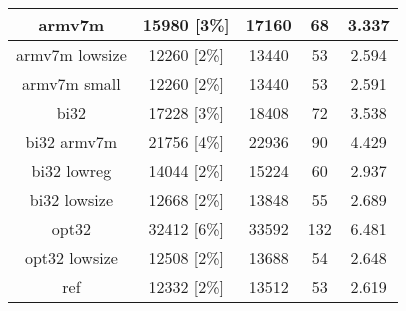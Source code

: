 \begin{table}[h]
\begin{tabular}{|c|c|c|c|c|}
        armv7m & 15980 [3\%] & 17160 & 68 & 3.337 \\
        \hline
        armv7m lowsize & 12260 [2\%] & 13440 & 53 & 2.594 \\
        \hline
        armv7m small & 12260 [2\%] & 13440 & 53 & 2.591 \\
        \hline
        bi32 & 17228 [3\%] & 18408 & 72 & 3.538 \\
        \hline
        bi32 armv7m & 21756 [4\%] & 22936 & 90 & 4.429 \\
        \hline
        bi32 lowreg & 14044 [2\%] & 15224 & 60 & 2.937 \\
        \hline
        bi32 lowsize & 12668 [2\%] & 13848 & 55 & 2.689 \\
        \hline
        opt32 & 32412 [6\%] & 33592 & 132 & 6.481 \\
        \hline
        opt32 lowsize & 12508 [2\%] & 13688 & 54 & 2.648 \\
        \hline
        ref & 12332 [2\%] & 13512 & 53 & 2.619 \\
        \hline
    \end{tabular}
\end{table}

